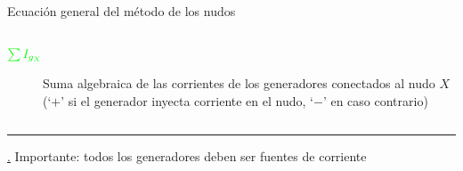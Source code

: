 \documentclass[aspectratio=169, xcolor={usenames,svgnames,dvipsnames}]{beamer}
\begin{document}
\begin{frame}{Ecuación general del método de los nudos}
\begin{columns}
\begin{column}{1.01\textwidth}
\begin{description}
        \item[{\({\color{green}\sum I_{g_X}}\)}] Suma algebraica de las corrientes de los generadores conectados al nudo $X$ (`$+$' si el generador inyecta corriente en el nudo, `$-$' en caso contrario)
        \end{description}
    \end{column}
    \end{columns}

    \vspace{2mm}

    \noindent\rule{\textwidth}{0.5pt}
    
    \hyperlink{diapo:bobina_inicio}{.} %
    \hspace{19mm}\alert{Importante}: todos los generadores deben ser fuentes de corriente
\end{frame}



\end{document}
